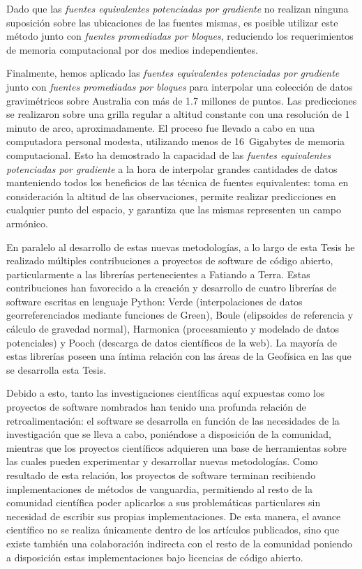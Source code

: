 Dado que las \emph{fuentes equivalentes potenciadas por gradiente} no realizan
ninguna suposición sobre las ubicaciones de las fuentes mismas, es posible
utilizar este método junto con \emph{fuentes promediadas por bloques},
reduciendo los requerimientos de memoria computacional por dos medios
independientes.

Finalmente, hemos aplicado las \emph{fuentes equivalentes potenciadas por
gradiente} junto con \emph{fuentes promediadas por bloques} para interpolar una
colección de datos gravimétricos sobre Australia con más de 1.7 millones de
puntos.
Las predicciones se realizaron sobre una grilla regular a altitud constante con
una resolución de 1 minuto de arco, aproximadamente.
El proceso fue llevado a cabo en una computadora personal modesta, utilizando
menos de 16~Gigabytes de memoria computacional.
Esto ha demostrado la capacidad de las \emph{fuentes equivalentes potenciadas
por gradiente} a la hora de interpolar grandes cantidades de datos manteniendo
todos los beneficios de las técnica de fuentes equivalentes: toma en
consideración la altitud de las observaciones, permite realizar predicciones en
cualquier punto del espacio, y garantiza que las mismas representen un campo
armónico.

\vspace{1em}

En paralelo al desarrollo de estas nuevas metodologías, a lo largo de esta
Tesis he realizado múltiples contribuciones a proyectos de software de código
abierto, particularmente a las librerías pertenecientes a Fatiando a Terra.
Estas contribuciones han favorecido a la creación y desarrollo de cuatro
librerías de software escritas en lenguaje Python: Verde (interpolaciones de
datos georreferenciados mediante funciones de Green), Boule (elipsoides de
referencia y cálculo de gravedad normal), Harmonica (procesamiento y modelado
de datos potenciales) y Pooch (descarga de datos científicos de la web).
La mayoría de estas librerías poseen una íntima relación con las áreas de la
Geofísica en las que se desarrolla esta Tesis.

Debido a esto, tanto las investigaciones científicas aquí expuestas como los
proyectos de software nombrados han tenido una profunda relación de
retroalimentación: el software se desarrolla en función de las necesidades de
la investigación que se lleva a cabo, poniéndose a disposición de la comunidad,
mientras que los proyectos científicos adquieren una base de herramientas
sobre las cuales pueden experimentar y desarrollar nuevas metodologías.
Como resultado de esta relación, los proyectos de software terminan recibiendo
implementaciones de métodos de vanguardia, permitiendo al resto de la comunidad
científica poder aplicarlos a sus problemáticas particulares sin necesidad de
escribir sus propias implementaciones.
De esta manera, el avance científico no se realiza únicamente dentro de los
artículos publicados, sino que existe también una colaboración indirecta con el
resto de la comunidad poniendo a disposición estas implementaciones bajo
licencias de código abierto.

